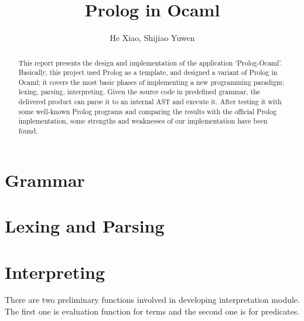 \documentclass[11pt,a4paper]{report}
\author{He Xiao, Shijiao Yuwen}
\title{Prolog in Ocaml}
\begin{document}
	\maketitle
	
\begin{abstract}
	This report presents the design and implementation of the application `Prolog-Ocaml'.
	Basically, this project used Prolog as a template, and designed a variant of Prolog in Ocaml;
	it covers the most basic phases of implementing a new programming paradigm: lexing, parsing, interpreting.
	Given the source code in predefined grammar, the delivered product can parse it to an internal AST and execute
	it. After testing it with some well-known Prolog programs and comparing the results with the official Prolog implementation,
	some strengths and weaknesses of our implementation have been found.  
\end{abstract}

\section*{Grammar}


\section*{Lexing and Parsing}


\section*{Interpreting}
There are two preliminary functions involved in developing interpretation module. The first one is evaluation function for terms and the second one is for predicates.\\
\end{document}
